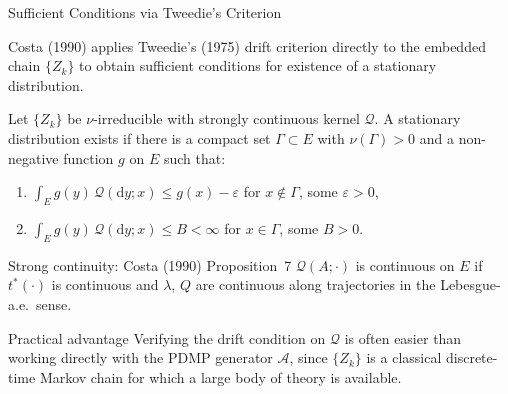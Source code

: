 \begin{frame}{Sufficient Conditions via Tweedie's Criterion}

  Costa (1990) applies Tweedie's (1975) drift criterion directly
  to the embedded chain $\{Z_k\}$ to obtain sufficient conditions
  for existence of a stationary distribution.

  \bigskip
  \begin{theorem}
    Let $\{Z_k\}$ be $\nu$-irreducible with strongly continuous
    kernel $\mathcal{Q}$. A stationary distribution exists if there
    is a compact set $\Gamma \subset E$ with $\nu(\Gamma) > 0$ and
    a non-negative function $g$ on $E$ such that:
    \begin{enumerate}
      \setlength\itemsep{4pt}
      \item $\int_E g(y)\,\mathcal{Q}(\mathrm{d}y;x)
            \leq g(x) - \varepsilon$
            \quad for $x \notin \Gamma$, some $\varepsilon > 0$,
      \item $\int_E g(y)\,\mathcal{Q}(\mathrm{d}y;x)
            \leq B < \infty$
            \quad for $x \in \Gamma$, some $B > 0$.
    \end{enumerate}
  \end{theorem}

  \bigskip
  \begin{block}{Strong continuity: Costa (1990) Proposition~7}
    $\mathcal{Q}(A;\cdot)$ is continuous on $E$ if $t^*(\cdot)$
    is continuous and $\lambda$, $Q$ are continuous along
    trajectories in the Lebesgue-a.e.\ sense.
  \end{block}

  \bigskip
  \begin{block}{Practical advantage}
    Verifying the drift condition on $\mathcal{Q}$ is often easier
    than working directly with the PDMP generator $\mathcal{A}$,
    since $\{Z_k\}$ is a classical discrete-time Markov chain for
    which a large body of theory is available.
  \end{block}

\end{frame}
